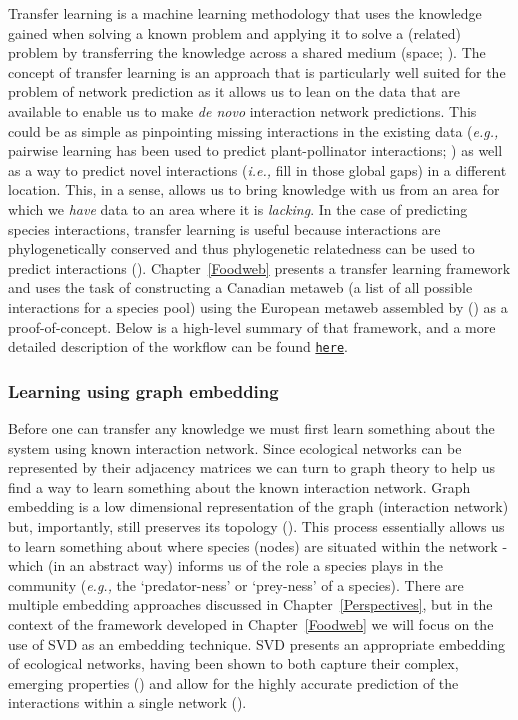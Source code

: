 \begin{refsection}
Transfer learning is a machine learning methodology that uses the 
knowledge gained when solving a known problem and
applying it to solve a (related) problem by transferring the knowledge
across a shared medium (space; \cite{Torrey2010Transfer, Pan2010Survey}).
The concept of transfer learning is an approach that is particularly well suited for the problem of network
prediction as it allows us to lean on the data that are available to 
enable us to make \emph{de novo} interaction network predictions. This could be as simple as pinpointing missing interactions in the existing data 
(\emph{e.g.,} pairwise learning has been used to predict plant-pollinator
interactions; \cite{Stock2021Pairwise}) as well as a way to predict
novel interactions (\emph{i.e.,} fill in those global gaps) in a different location. This, in a sense, allows us to bring knowledge with us from an area for which we \emph{have} data to an area where it is \emph{lacking}. In the case of predicting species interactions, transfer learning is useful because interactions are phylogenetically conserved and thus phylogenetic relatedness can be used to predict interactions (\cite{Davies2021EcoRed, Elmasri2020HieBay, Gomez2010EcoInt}). Chapter~\ref{Foodweb} presents a transfer learning framework and uses the task of constructing a Canadian metaweb (a list of all possible interactions for a species pool) using the European metaweb assembled by (\cite{Maiorano2020Tetraeu}) as a proof-of-concept. Below is a high-level summary of that framework, and a more detailed description of the workflow can be found \href{https://osf.io/2zwqm/}{\texttt{here}}.

\subsubsection{Learning using graph embedding}\label{learning-using-embedding}

Before one can transfer any knowledge we must first learn something about the system using known interaction network. Since ecological networks can be represented by their adjacency matrices we can turn to graph theory to help us find a way to learn something about the known interaction network. Graph embedding is a low dimensional representation of the graph (interaction network) but, importantly, still preserves its topology (\cite{Yan2005Graph}). This process essentially allows us to learn something about where species (nodes) are situated within the network - which (in an abstract way) informs us of the role a species plays in the community (\emph{e.g.,} the `predator-ness' or `prey-ness' of a species). There are multiple embedding approaches discussed in Chapter~\ref{Perspectives}, but in the context of the framework developed in Chapter~\ref{Foodweb} we will focus on the use of SVD as an embedding technique. SVD presents an appropriate embedding of ecological networks, having been shown to both capture their complex, emerging properties (\cite{Strydom2021SvdEnt}) and allow for the highly accurate prediction of the interactions within a single network (\cite{Poisot2021ImpMam}).


\end{refsection}
